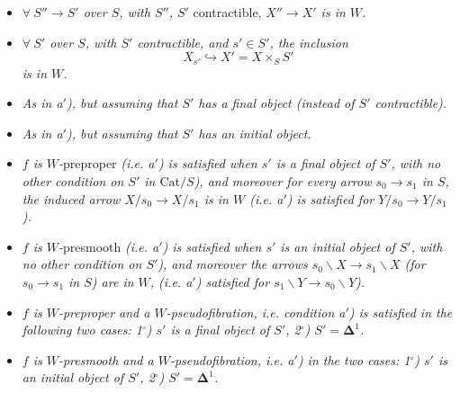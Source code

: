 \documentclass[11pt]{article}
\newcommand{\printedpage}[1]{\marginpar{\footnotesize p.~#1}}
\begin{document}
\begin{itemize}[leftmargin=4em]
\item[\textit{a)}] \textit{$\forall\ S'' \longrightarrow S'$ over $S$, with $S''$, $S'$} contractible, \textit{$X'' \longrightarrow X'$ is in $W$.}

\item[\textit{a}$'$\textit{)}] \textit{$\forall\ S'$ over $S$, with $S'$ contractible, and $s' \in S'$, the inclusion} %
\[ X_{s'} \hookrightarrow X' = X \times_S S' \]
\textit{is in $W$.}

\item[\textit{a}$_1$\textit{)}] \textit{As in a$'$), but assuming that $S'$ has a final object (instead of $S'$ contractible).} %

\item[\textit{a}$_2$\textit{)}] \textit{As in a$'$), but assuming that $S'$ has an initial object.} %

\printedpage{37}

\item[\textit{b}$_1$\textit{)}] \textit{$f$ is $W$-}preproper \textit{(i.e. a$'$) is satisfied when $s'$ is a final object of $S'$, with no other condition on $S'$ in $\mathrm{Cat}/S$), and moreover for every arrow $s_0 \longrightarrow s_1$ in $S$, the induced arrow $X/s_0 \longrightarrow X/s_1$ is in $W$ (i.e. a$'$) is satisfied for $Y/s_0 \longrightarrow Y/s_1$).}

\item[\textit{b}$_2$\textit{)}] \textit{$f$ is $W$-}presmooth \textit{(i.e. a$'$) is satisfied when $s'$ is an initial object of $S'$, with no other condition on $S'$), and moreover the arrows $s_0\backslash X \longrightarrow s_1\backslash X$ (for $s_0 \longrightarrow s_1$ in $S$) are in $W$, (i.e. a$'$) satisfied for $s_1\backslash Y \longrightarrow s_0\backslash Y$).}

\item[\textit{c}$_1$\textit{)}] \textit{$f$ is $W$-preproper and a $W$-pseudofibration, i.e. condition a$'$) is satisfied in the following two cases: 1$^\circ$) $s'$ is a final object of $S'$, 2$^\circ$) $S' = \mathbf{\Delta}^1$.}

\item[\textit{c}$_2$\textit{)}] \textit{$f$ is $W$-presmooth and a $W$-pseudofibration, i.e. a$'$) in the two cases: 1$^\circ$) $s'$ is an initial object of $S'$, 2$^\circ$) $S' = \mathbf{\Delta}^1$.}
\end{itemize}
\end{document}
